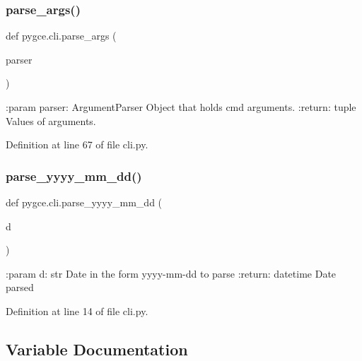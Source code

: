 \subsubsection{\texorpdfstring{parse\+\_\+args()}{parse\_args()}}
{\footnotesize\ttfamily def pygce.\+cli.\+parse\+\_\+args (\begin{DoxyParamCaption}\item[{}]{parser }\end{DoxyParamCaption})}

\begin{DoxyVerb}:param parser: ArgumentParser
    Object that holds cmd arguments.
:return: tuple
    Values of arguments.
\end{DoxyVerb}
 

Definition at line 67 of file cli.\+py.

\mbox{\label{namespacepygce_1_1cli_a807a6becfdbbb6dab4fede7208861afc}} 
\subsubsection{\texorpdfstring{parse\+\_\+yyyy\+\_\+mm\+\_\+dd()}{parse\_yyyy\_mm\_dd()}}
{\footnotesize\ttfamily def pygce.\+cli.\+parse\+\_\+yyyy\+\_\+mm\+\_\+dd (\begin{DoxyParamCaption}\item[{}]{d }\end{DoxyParamCaption})}

\begin{DoxyVerb}:param d: str
    Date in the form yyyy-mm-dd to parse
:return: datetime
    Date parsed
\end{DoxyVerb}
 

Definition at line 14 of file cli.\+py.



\subsection{Variable Documentation}
\mbox{\label{namespacepygce_1_1cli_a13e8047ab788ce64d94c1077ad4218e5}} 
